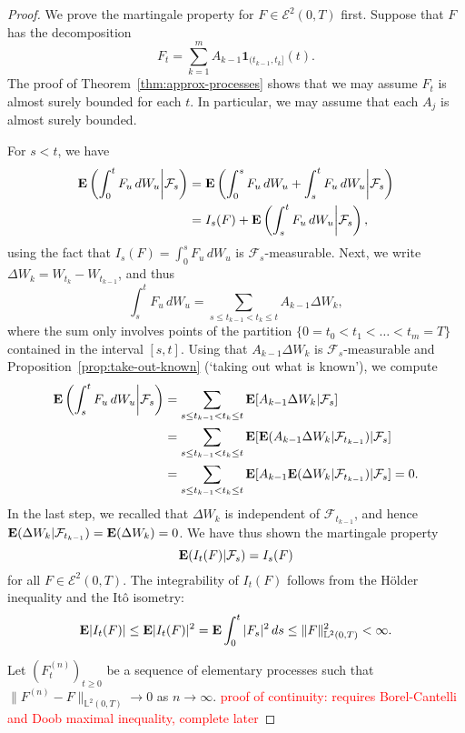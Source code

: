 \begin{proof}
    We prove the martingale property for $F\in\mathcal{E}^2(0,T)$ first. Suppose that $F$ has the decomposition
    \begin{equation*}
        F_t = \sum_{k=1}^m A_{k-1}\mathbf{1}_{(t_{k-1},t_k]}(t).
    \end{equation*}
    The proof of Theorem~\ref{thm:approx-processes} shows that we may assume $F_t$ is almost surely bounded for each $t$. In particular, we may assume that each $A_{j}$ is almost surely bounded.
    
    For $s<t$, we have
    \begin{align*}
        \mathbf{E}\left(\int_0^t F_u\,dW_u \bigg\vert\mathcal{F}_s\right) &= \mathbf{E}\left(\int_0^s F_u\,dW_u + \int_s^t F_u\,dW_u \bigg\vert\mathcal{F}_s\right) \\
        &= I_s(F) + \mathbf{E}\left(\int_s^t F_u\,dW_u \bigg\vert\mathcal{F}_s\right),
    \end{align*}
    using the fact that $I_s(F) = \int_0^s F_u\,dW_u$ is $\mathcal{F}_s$-measurable. Next, we write $\Delta W_k = W_{t_k}-W_{t_{k-1}}$, and thus
    \begin{equation*}
        \int_s^t F_u\,dW_u = \sum_{s\le t_{k-1}<t_k\le t} A_{k-1}\Delta W_k,
    \end{equation*}
    where the sum only involves points of the partition $\{0=t_0<t_1<\ldots <t_m=T\}$ contained in the interval $[s,t]$. Using that $A_{k-1}\Delta W_k$ is $\mathcal{F}_s$-measurable and Proposition~\ref{prop:take-out-known} (`taking out what is known'), we compute
    \begin{align*}
        \mathbf{E}\left(\int_s^t F_u\,dW_u \bigg\vert\mathcal{F}_s\right) &= \sum_{s\le t_{k-1}<t_k\le t} \mathbf{E}[A_{k-1}\Delta W_k|\mathcal{F}_s] \\
        &= \sum_{s\le t_{k-1}<t_k\le t} \mathbf{E}[\mathbf{E}(A_{k-1}\Delta W_k|\mathcal{F}_{t_{k-1}})|\mathcal{F}_s] \\
        &= \sum_{s\le t_{k-1}<t_k\le t} \mathbf{E}[A_{k-1}\mathbf{E}(\Delta W_k|\mathcal{F}_{t_{k-1}})|\mathcal{F}_s] = 0.
    \end{align*}
    In the last step, we recalled that $\Delta W_k$ is independent of $\mathcal{F}_{t_{k-1}}$, and hence $\mathbf{E}(\Delta W_k|\mathcal{F}_{t_{k-1}})=\mathbf{E}(\Delta W_k)=0$. We have thus shown the martingale property
    \begin{equation*}
        \mathbf{E}(I_t(F)|\mathcal{F}_s) = I_s(F)
    \end{equation*}
    for all $F\in\mathcal{E}^2(0,T)$. The integrability of $I_t(F)$ follows from the H\"{o}lder inequality and the It\^{o} isometry:
    \begin{equation*}
        \mathbf{E}|I_t(F)| \le \mathbf{E}|I_t(F)|^2 = \mathbf{E}\int_0^t |F_s|^2\,ds \le \|F\|^2_{\mathbb{L}^2(0,T)}<\infty.
    \end{equation*}
    
    Let $(F^{(n)}_t)_{t\ge 0}$ be a sequence of elementary processes such that $\|F^{(n)}-F\|_{\mathbb{L}^2(0,T)}\to 0$ as $n\to\infty$.
    \textcolor{red}{proof of continuity: requires Borel-Cantelli and Doob maximal inequality, complete later}
\end{proof}

